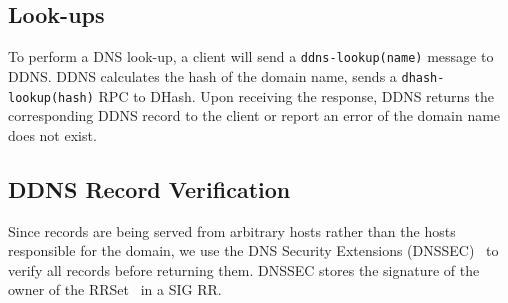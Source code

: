 \subsection{Look-ups}

To perform a DNS look-up, a client will send a 
{\tt ddns-lookup(name)} message to {DDNS}.
DDNS 
calculates the hash of the domain name, sends a
{\tt dhash-lookup(hash)} RPC to DHash. Upon receiving
the response, DDNS returns the corresponding DDNS record to the 
client or report an error of the domain name does 
not exist.

\subsection{DDNS Record Verification}

Since records are being served from arbitrary hosts rather
than the hosts responsible for the domain, 
we use the DNS Security Extensions (DNSSEC)~\cite{dnssec:rfc} to
verify all records before returning them. DNSSEC stores the 
signature of the owner of the RRSet~\cite{dns-cla:rfc} in a 
SIG RR.
